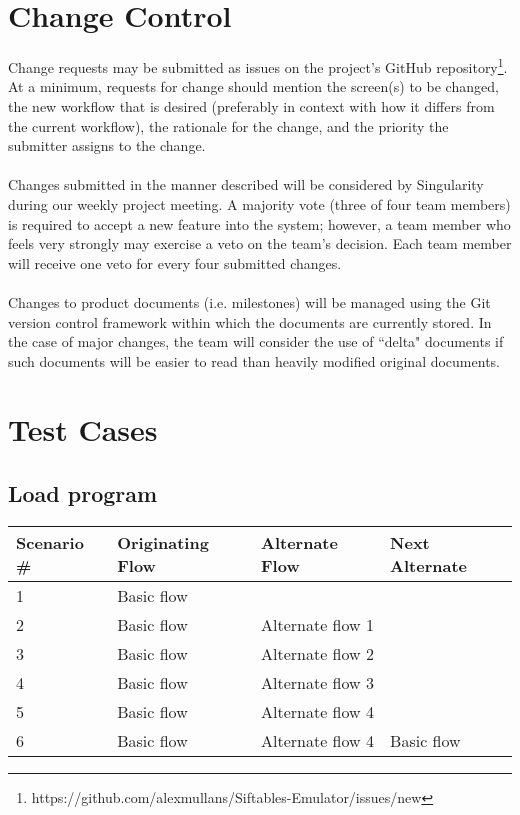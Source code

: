 \documentclass[12pt]{article}
\begin{document}
\section{Change Control}
Change requests may be submitted as issues on the project's GitHub repository\footnote{https://github.com/alexmullans/Siftables-Emulator/issues/new}. At a minimum, requests for change should mention the screen(s) to be changed, the new workflow that is desired (preferably in context with how it differs from the current workflow), the rationale for the change, and the priority the submitter assigns to the change. \\\\
Changes submitted in the manner described will be considered by Singularity during our weekly project meeting. A majority vote (three of four team members) is required to accept a new feature into the system; however, a team member who feels very strongly may exercise a veto on the team's decision. Each team member will receive one veto for every four submitted changes. \\\\
Changes to product documents (i.e. milestones) will be managed using the Git version control framework within which the documents are currently stored. In the case of major changes, the team will consider the use of ``delta" documents if such documents will be easier to read than heavily modified original documents.

\clearpage
\section{Test Cases}

\subsection{Load program}

\begin{table}[h!]
  \begin{tabular}{l | l | l | l}
    \textbf{Scenario \#} &
    \textbf{Originating Flow} &
    \textbf{Alternate Flow} &
    \textbf{Next Alternate} \\ \hline

    1 &
    Basic flow &
    &
    \\ \hline

    2 &
    Basic flow &
    Alternate flow 1 &
    \\ \hline

    3 &
    Basic flow &
    Alternate flow 2 &
    \\ \hline

    4 &
    Basic flow &
    Alternate flow 3 &
    \\ \hline

    5 &
    Basic flow &
    Alternate flow 4 &
    \\ \hline

    6 &
    Basic flow &
    Alternate flow 4 &
    Basic flow \\ \hline

  \end{tabular}
\end{table}
\end{document}
